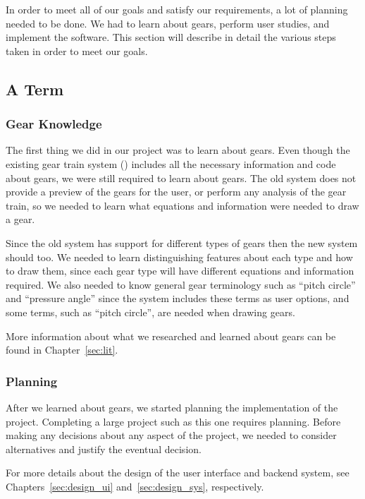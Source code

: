 \begin{doublespace}

In order to meet all of our goals and satisfy our requirements, a lot of planning needed to be done. We had to learn about gears, perform user studies, and implement the software. This section will describe in detail the various steps taken in order to meet our goals.

\subsection{A Term}

\subsubsection{Gear Knowledge}

The first thing we did in our project was to learn about gears. Even though the existing gear train system (\cite{holman_automated_2018}) includes all the necessary information and code about gears, we were still required to learn about gears. The old system does not provide a preview of the gears for the user, or perform any analysis of the gear train, so we needed to learn what equations and information were needed to draw a gear.

Since the old system has support for different types of gears then the new system should too. We needed to learn distinguishing features about each type and how to draw them, since each gear type will have different equations and information required. We also needed to know general gear terminology such as ``pitch circle'' and ``pressure angle'' since the system includes these terms as user options, and some terms, such as ``pitch circle'', are needed when drawing gears.

More information about what we researched and learned about gears can be found in Chapter~\ref{sec:lit}.

\subsubsection{Planning}

After we learned about gears, we started planning the implementation of the project. Completing a large project such as this one requires planning. Before making any decisions about any aspect of the project, we needed to consider alternatives and justify the eventual decision.

For more details about the design of the user interface and backend system, see Chapters~\ref{sec:design_ui} and~\ref{sec:design_sys}, respectively.


\end{doublespace}
